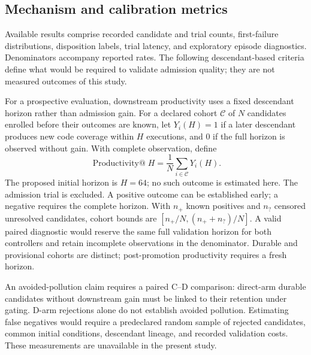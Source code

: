 \documentclass[final,5p,times,number]{elsarticle}
\begin{document}
\subsection{Mechanism and calibration metrics}
Available results comprise recorded candidate and trial counts, first-failure distributions, disposition labels, trial latency, and exploratory episode diagnostics. Denominators accompany reported rates. The following descendant-based criteria define what would be required to validate admission quality; they are not measured outcomes of this study.

For a prospective evaluation, downstream productivity uses a fixed descendant horizon rather than admission gain. For a declared cohort $\mathcal{C}$ of $N$ candidates enrolled before their outcomes are known, let $Y_i(H)=1$ if a later descendant produces new code coverage within $H$ executions, and $0$ if the full horizon is observed without gain. With complete observation, define
\begin{equation}
\operatorname{Productivity@}H=\frac{1}{N}\sum_{i\in\mathcal{C}}Y_i(H).
\end{equation}
The proposed initial horizon is $H=64$; no such outcome is estimated here. The admission trial is excluded. A positive outcome can be established early; a negative requires the complete horizon. With $n_+$ known positives and $n_?$ censored unresolved candidates, cohort bounds are $[n_+/N,(n_++n_?)/N]$. A valid paired diagnostic would reserve the same full validation horizon for both controllers and retain incomplete observations in the denominator. Durable and provisional cohorts are distinct; post-promotion productivity requires a fresh horizon.

An avoided-pollution claim requires a paired C--D comparison: direct-arm durable candidates without downstream gain must be linked to their retention under gating. D-arm rejections alone do not establish avoided pollution. Estimating false negatives would require a predeclared random sample of rejected candidates, common initial conditions, descendant lineage, and recorded validation costs. These measurements are unavailable in the present study.
\end{document}
